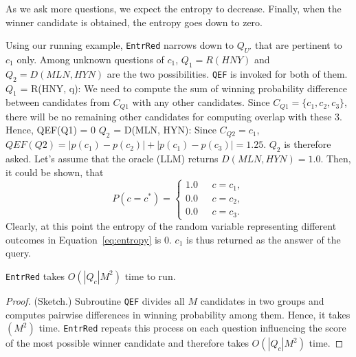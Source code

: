 As we ask more questions, we expect the entropy to decrease. Finally, when the winner candidate is obtained, the entropy goes down to zero. 

Using our running example, {\tt EntrRed} narrows down to $Q_{U'}$ that are pertinent to $c_1$ only. Among unknown questions of $c_1$, $Q_1= R(HNY)$ and $Q_2=D(MLN, HYN)$ are the two possibilities. {\tt QEF} is invoked for both of them.
  $Q_1$ = R(HNY, q): We need to compute the sum of winning probability difference between candidates from $C_{Q1}$ with any other candidates. Since $C_{Q1} = \{c_1, c_2, c_3\}$, there will be no remaining other candidates for computing overlap with these 3. Hence, QEF(Q1) = 0
$Q_2$ = D(MLN, HYN): Since $C_{Q2} = {c_1}$, $QEF(Q2) = |p(c_1) - p(c_2)| + |p(c_1) - p(c_3)|=1.25$. $Q_2$ is therefore asked.
Let's assume that the oracle (LLM) returns $D(MLN, HYN) = 1.0$. Then, it could be shown, that
\[
P(c = c^*) =
\begin{cases} 
1.0 & \text{ } c = c_1, \\
0.0 & \text{ } c = c_2, \\
0.0 & \text{ } c = c_3.
\end{cases}
\]
Clearly, at this point the entropy of the random variable representing different outcomes in Equation~\ref{eq:entropy} is $0$. $c_1$ is thus returned as the answer of the query.

\begin{lemma}
  {\tt EntrRed} takes $O(|Q_c|M^2)$ time to run.
\end{lemma}

\begin{proof}
(Sketch.)
Subroutine {\tt QEF} divides all $M$ candidates in two groups and computes pairwise differences in winning probability  among them. Hence, it takes $(M^2)$ time. {\tt EntrRed} repeats this process on each question influencing the score of the most possible winner candidate and therefore takes $O(|Q_c|M^2)$ time.
\end{proof}



